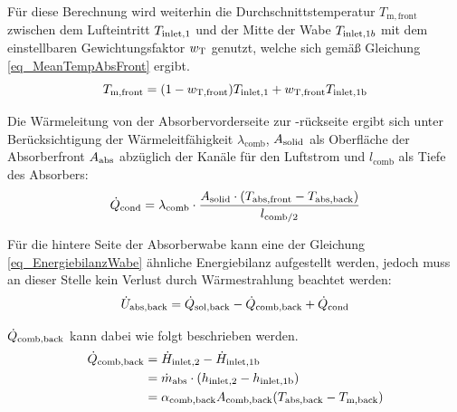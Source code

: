 Für diese Berechnung wird weiterhin die Durchschnittstemperatur $T_{\mathrm{m,front}}$ zwischen dem Lufteintritt $T_{\mathrm{inlet,}1}$ und der Mitte der Wabe $T_{\mathrm{inlet,}1b}$ mit dem einstellbaren Gewichtungsfaktor $w_{\mathrm{T}}$ genutzt, welche sich gemäß Gleichung \ref{eq_MeanTempAbsFront} ergibt.
\begin{equation} \label{eq_MeanTempAbsFront}
    T_{\mathrm{m,front}} = (1-w_{\mathrm{T,front}}) T_{\mathrm{inlet,}1} + w_{\mathrm{T,front}} T_{\mathrm{inlet,}\mathrm{1b}}
\end{equation}

Die Wärmeleitung von der Absorbervorderseite zur -rückseite ergibt sich unter Berücksichtigung der Wärmeleitfähigkeit $\lambda_{\mathrm{comb}}$, $A_{\mathrm{solid}}$ als Oberfläche der Absorberfront $A_{\mathrm{abs}}$ abzüglich der Kanäle für den Luftstrom und $l_{\mathrm{comb}}$ als Tiefe des Absorbers:
\begin{equation} \label{eq_WärmeleitungVorneHinten}
    \dot{Q}_{\mathrm{cond}} = \lambda_{\mathrm{comb}} \cdot \frac{A_{\mathrm{solid}} \cdot (T_{\mathrm{abs,front}}-T_{\mathrm{abs,back}})}{l_{\mathrm{comb}/2}}
\end{equation}

Für die hintere Seite der Absorberwabe kann eine der Gleichung \ref{eq_EnergiebilanzWabe} ähnliche Energiebilanz aufgestellt werden, jedoch muss an dieser Stelle kein Verlust durch Wärmestrahlung beachtet werden:
\begin{equation} \label{eq_EnergiebilanzWabeHinten}
    \dot{U}_{\mathrm{abs}, \mathrm{back}} =\dot{Q}_{\mathrm{sol,back}} -\dot{Q}_{\mathrm{comb,back}} + \dot{Q}_{\mathrm{cond}}
\end{equation}

$\dot{Q}_{\mathrm{comb,back}}$ kann dabei wie folgt beschrieben werden.
\begin{equation} \label{eq_KonvektionWabeHinten}
    \begin{aligned}
        \dot{Q}_{\mathrm{comb,back}} & = \dot{H}_{\mathrm{inlet,}2} - \dot{H}_{\mathrm{inlet,}\mathrm{1b}}                                          \\
                              & = \dot{m}_{\mathrm{abs}} \cdot ( h_{\mathrm{inlet,}2} - h_{\mathrm{inlet,}\mathrm{1b}})        \\
                              & = \alpha_{\mathrm{comb},\mathrm{back}} A_{\mathrm{comb},\mathrm{back}} (T_{\mathrm{abs,back}}-T_{\mathrm{m,back}})
    \end{aligned}
\end{equation}

